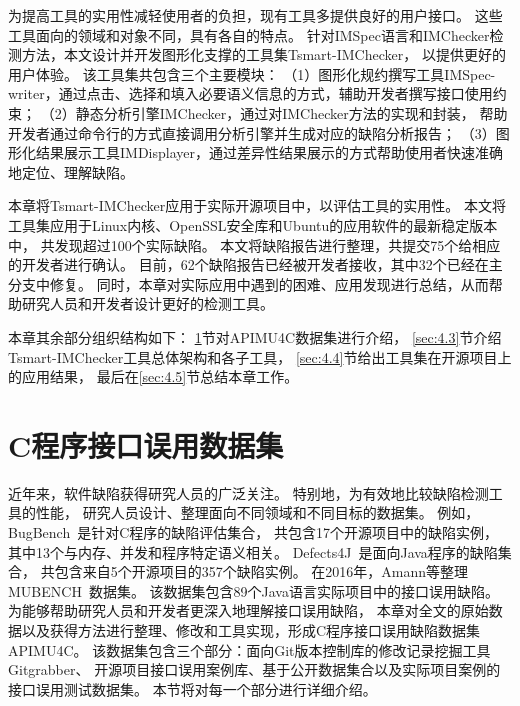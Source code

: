 为提高工具的实用性减轻使用者的负担，现有工具多提供良好的用户接口。
这些工具面向的领域和对象不同，具有各自的特点。
针对IMSpec语言和IMChecker检测方法，本文设计并开发图形化支撑的工具集Tsmart-IMChecker，
以提供更好的用户体验。
该工具集共包含三个主要模块：
（1）图形化规约撰写工具IMSpec-writer，通过点击、选择和填入必要语义信息的方式，辅助开发者撰写接口使用约束；
（2）静态分析引擎IMChecker，通过对IMChecker方法的实现和封装，
帮助开发者通过命令行的方式直接调用分析引擎并生成对应的缺陷分析报告；
（3）图形化结果展示工具IMDisplayer，通过差异性结果展示的方式帮助使用者快速准确地定位、理解缺陷。

本章将Tsmart-IMChecker应用于实际开源项目中，以评估工具的实用性。
本文将工具集应用于Linux内核、OpenSSL安全库和Ubuntu的应用软件的最新稳定版本中，
共发现超过100个实际缺陷。
本文将缺陷报告进行整理，共提交75个给相应的开发者进行确认。
目前，62个缺陷报告已经被开发者接收，其中32个已经在主分支中修复。
同时，本章对实际应用中遇到的困难、应用发现进行总结，从而帮助研究人员和开发者设计更好的检测工具。



本章其余部分组织结构如下：
\ref{sec:4.2}节对APIMU4C数据集进行介绍，
\ref{sec:4.3}节介绍Tsmart-IMChecker工具总体架构和各子工具，
\ref{sec:4.4}节给出工具集在开源项目上的应用结果，
最后在\ref{sec:4.5}节总结本章工作。

\section{C程序接口误用数据集}
\label{sec:4.2}
近年来，软件缺陷获得研究人员的广泛关注。
特别地，为有效地比较缺陷检测工具的性能，
研究人员设计、整理面向不同领域和不同目标的数据集。
例如，BugBench~\cite{05-bugbench}是针对C程序的缺陷评估集合，
共包含17个开源项目中的缺陷实例，
其中13个与内存、并发和程序特定语义相关。
Defects4J~\cite{14-issta-defects4j}是面向Java程序的缺陷集合，
共包含来自5个开源项目的357个缺陷实例。
在2016年，Amann等整理MUBENCH~\cite{16-msr-mubench}数据集。
该数据集包含89个Java语言实际项目中的接口误用缺陷。
为能够帮助研究人员和开发者更深入地理解接口误用缺陷，
本章对全文的原始数据以及获得方法进行整理、修改和工具实现，形成C程序接口误用缺陷数据集APIMU4C。
该数据集包含三个部分：面向Git版本控制库的修改记录挖掘工具Gitgrabber、
开源项目接口误用案例库、基于公开数据集合以及实际项目案例的接口误用测试数据集。
本节将对每一个部分进行详细介绍。


